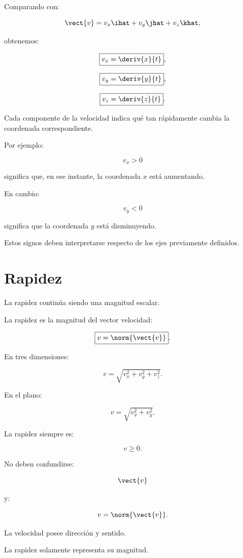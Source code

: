 Comparando con:

\[
\vect{v}
=
v_x\ihat+v_y\jhat+v_z\khat,
\]

obtenemos:

\[
\boxed{
v_x=\deriv{x}{t}
},
\]

\[
\boxed{
v_y=\deriv{y}{t}
},
\]

\[
\boxed{
v_z=\deriv{z}{t}
}.
\]

\begin{interpretacion}
Cada componente de la velocidad indica qué tan rápidamente cambia la coordenada
correspondiente.

Por ejemplo:

\[
v_x>0
\]

significa que, en ese instante, la coordenada \(x\) está aumentando.

En cambio:

\[
v_y<0
\]

significa que la coordenada \(y\) está disminuyendo.

Estos signos deben interpretarse respecto de los ejes previamente definidos.
\end{interpretacion}


\section{Rapidez}

La rapidez continúa siendo una magnitud escalar.

\begin{definicion}
La rapidez es la magnitud del vector velocidad:

\[
\boxed{
v=\norm{\vect{v}}
}.
\]
\end{definicion}

En tres dimensiones:

\[
\boxed{
v
=
\sqrt{v_x^2+v_y^2+v_z^2}
}.
\]

En el plano:

\[
\boxed{
v
=
\sqrt{v_x^2+v_y^2}
}.
\]

La rapidez siempre es:

\[
v\geq0.
\]

\begin{advertencia}
No deben confundirse:

\[
\vect{v}
\]

y:

\[
v=\norm{\vect{v}}.
\]

La velocidad posee dirección y sentido.

La rapidez solamente representa su magnitud.
\end{advertencia}


